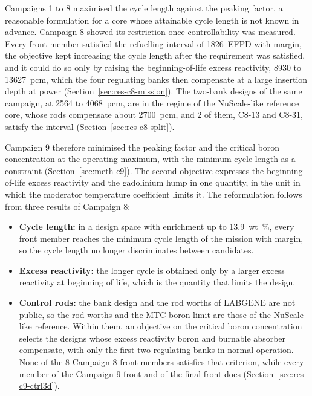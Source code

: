 Campaigns 1 to 8 maximised the cycle length against the peaking factor,
a reasonable formulation for a core whose attainable cycle length is
not known in advance. Campaign 8 showed its restriction once
controllability was measured. Every front member satisfied the
refuelling interval of \SI{1826}{EFPD} with margin, the objective kept increasing
the cycle length after the requirement was satisfied, and it could do
so only by raising the beginning-of-life excess reactivity, \num{8930}
to \SI{13627}{pcm}, which the four regulating banks then compensate at
a large insertion depth at power (Section~\ref{sec:res-c8-mission}).
The two-bank designs of the same campaign, at \num{2564} to
\SI{4068}{pcm}, are in the regime of the NuScale-like reference core,
whose rods compensate about \SI{2700}{pcm}, and 2 of them, C8-13 and
C8-31, satisfy the interval (Section~\ref{sec:res-c8-split}).

Campaign 9 therefore minimised the peaking factor and the critical
boron concentration at the operating maximum, with the minimum cycle
length as a constraint (Section~\ref{sec:meth-c9}). The second
objective expresses the beginning-of-life excess reactivity and the
gadolinium hump in one quantity, in the unit in which the moderator
temperature coefficient limits it. The reformulation follows from three
results of Campaign 8:

\begin{itemize}
  \item \textbf{Cycle length:} in a design space with enrichment up to
        \SI{13.9}{wt\%}, every front member reaches the minimum cycle
        length of the mission with margin, so the cycle length no
        longer discriminates between candidates.
  \item \textbf{Excess reactivity:} the longer cycle is obtained only by
        a larger excess reactivity at beginning of life, which is the
        quantity that limits the design.
  \item \textbf{Control rods:} the bank design and the rod worths of
        LABGENE are not public, so the rod worths and the MTC boron
        limit are those of the NuScale-like reference. Within them, an
        objective on the critical boron concentration selects the
        designs whose excess reactivity boron and burnable absorber
        compensate, with only the first two regulating banks in normal
        operation. None of the 8 Campaign 8 front members satisfies
        that criterion, while every member of the Campaign 9 front and
        of the final front does (Section~\ref{sec:res-c9-ctrl3d}).
\end{itemize}

